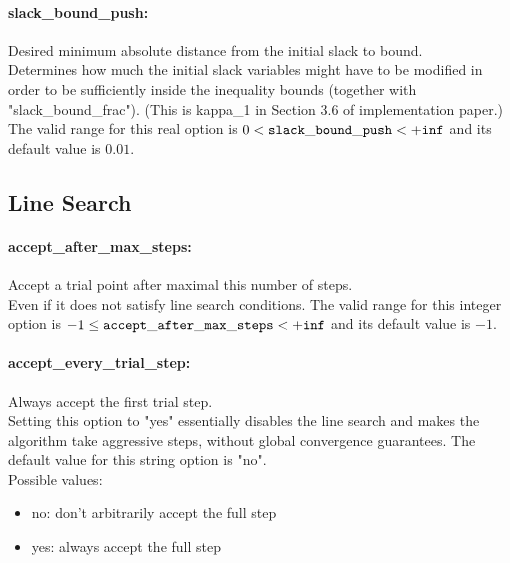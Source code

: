 \paragraph{slack\_bound\_push:}\label{sec:slack_bound_push} Desired minimum absolute distance from the initial slack to bound. $\;$ \\
 Determines how much the initial slack variables
might have to be modified in order to be
sufficiently inside the inequality bounds
(together with "slack\_bound\_frac").  (This is
kappa\_1 in Section 3.6 of implementation paper.) The valid range for this real option is 
$0 <  {\tt slack\_bound\_push } <  {\tt +inf}$
and its default value is $0.01$.


\subsection{Line Search}
\label{sec:Line_Search}
\paragraph{accept\_after\_max\_steps:}\label{sec:accept_after_max_steps} Accept a trial point after maximal this number of steps. $\;$ \\
 Even if it does not satisfy line search
conditions. The valid range for this integer option is
$-1 \le {\tt accept\_after\_max\_steps } <  {\tt +inf}$
and its default value is $-1$.


\paragraph{accept\_every\_trial\_step:}\label{sec:accept_every_trial_step} Always accept the first trial step. $\;$ \\
 Setting this option to "yes" essentially disables
the line search and makes the algorithm take
aggressive steps, without global convergence
guarantees.
The default value for this string option is "no".
\\ 
Possible values:
\begin{itemize}
   \item no: don't arbitrarily accept the full step
   \item yes: always accept the full step
\end{itemize}

